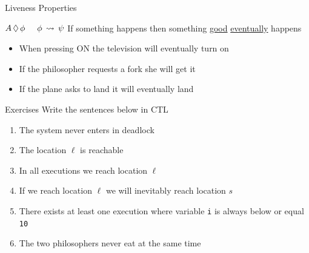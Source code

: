 \documentclass{beamer}
\begin{document}
\begin{slide}{Liveness Properties}

\begin{block}{$A\, \Diamond\, \phi \hspace{0.5cm} \phi\, \leadsto \, \psi$}
        If something happens then something \alert{\underline{good}}
        \alert{\underline{eventually}} happens
\begin{itemize}
	\item When pressing ON the
		television will eventually turn on
        \item If the philosopher requests a fork she will 
                get it
        \item If the plane asks to land it will eventually land
\end{itemize}

\end{block}

\end{slide}

\begin{frame}{Exercises}
	Write the sentences below in CTL
	\begin{enumerate}
		\item The system never enters in deadlock
		\item The location $\ell$ is reachable
		\item In all executions we reach location $\ell$
		\item If we reach location $\ell$ we will inevitably reach
			location $s$
		\item There exists at least one execution where variable
			\texttt{i} is always below or equal \texttt{10}
		\item The two philosophers never eat at the same time
	\end{enumerate}
\end{frame}
\end{document}
